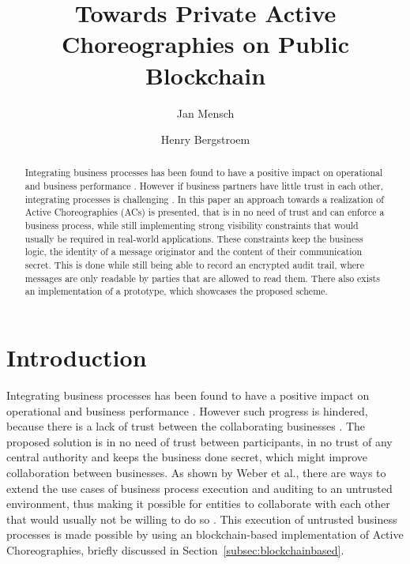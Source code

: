 \documentclass[runningheads]{llncs}
\newcommand{\refsec}[1]{Section~\ref{#1}}
\begin{document}
%
\title{Towards Private Active Choreographies on Public Blockchain }
%
%
\author{Jan Mensch \and Henry Bergstroem}
%
%


%
\maketitle              %
%
\begin{abstract}
    Integrating business processes has been found to have a positive impact on operational and business performance \cite{flynn2010impact,narayanan2011antecedents}. However if business partners have little trust in each other, integrating processes is challenging \cite{panayides2009impact}. In this paper an approach towards a realization of Active Choreographies (ACs) is presented, that is in no need of trust and can enforce a business process, while still implementing strong visibility constraints that would usually be required in real-world applications. These constraints keep the business logic, the identity of a message originator and the content of their communication secret. This is done while still being able to record an encrypted audit trail, where messages are only readable by parties that are allowed to read them. There also exists an implementation of a prototype, which showcases the proposed scheme.
\end{abstract}

\section{Introduction} \label{sec:intro}

Integrating business processes has been found to have a positive impact on operational and business performance \cite{flynn2010impact,narayanan2011antecedents}. However such progress is hindered, because there is a lack of trust between the collaborating businesses \cite{panayides2009impact}. The proposed solution is in no need of trust between participants, in no trust of any central authority and keeps the business done secret, which might improve collaboration between businesses. As shown by Weber et al., there are ways to extend the use cases of business process execution and auditing to an untrusted environment, thus making it possible for entities to collaborate with each other that would usually not be willing to do so \cite{weber2016untrusted}. This execution of untrusted business processes is made possible by using an blockchain-based implementation of Active Choreographies, briefly discussed in \refsec{subsec:blockchainbased}.
\end{document}

